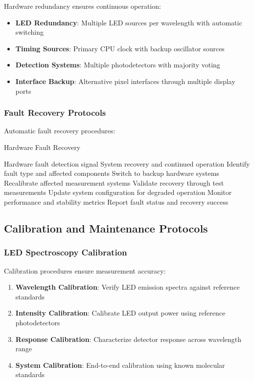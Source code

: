 Hardware redundancy ensures continuous operation:

\begin{itemize}
\item \textbf{LED Redundancy}: Multiple LED sources per wavelength with automatic switching
\item \textbf{Timing Sources}: Primary CPU clock with backup oscillator sources  
\item \textbf{Detection Systems}: Multiple photodetectors with majority voting
\item \textbf{Interface Backup}: Alternative pixel interfaces through multiple display ports
\end{itemize}

\subsubsection{Fault Recovery Protocols}

Automatic fault recovery procedures:

\begin{algorithm}[H]
\caption{Hardware Fault Recovery}
\begin{algorithmic}[1]
\REQUIRE Hardware fault detection signal
\ENSURE System recovery and continued operation
\STATE Identify fault type and affected components
\STATE Switch to backup hardware systems
\STATE Recalibrate affected measurement systems
\STATE Validate recovery through test measurements
\STATE Update system configuration for degraded operation
\STATE Monitor performance and stability metrics
\STATE Report fault status and recovery success
\end{algorithmic}
\end{algorithm}

\subsection{Calibration and Maintenance Protocols}

\subsubsection{LED Spectroscopy Calibration}

Calibration procedures ensure measurement accuracy:

\begin{enumerate}
\item \textbf{Wavelength Calibration}: Verify LED emission spectra against reference standards
\item \textbf{Intensity Calibration}: Calibrate LED output power using reference photodetectors
\item \textbf{Response Calibration}: Characterize detector response across wavelength range
\item \textbf{System Calibration}: End-to-end calibration using known molecular standards
\end{enumerate}

